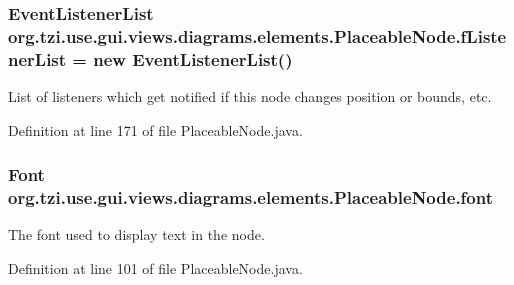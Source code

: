 \hypertarget{classorg_1_1tzi_1_1use_1_1gui_1_1views_1_1diagrams_1_1elements_1_1_placeable_node_a5bed45ff06fa7f6babf3260525d694c7}{
\subsubsection[{f\-Listener\-List}]{\setlength{\rightskip}{0pt plus 5cm}Event\-Listener\-List org.\-tzi.\-use.\-gui.\-views.\-diagrams.\-elements.\-Placeable\-Node.\-f\-Listener\-List = new Event\-Listener\-List()\hspace{0.3cm}{\ttfamily [protected]}}}\label{classorg_1_1tzi_1_1use_1_1gui_1_1views_1_1diagrams_1_1elements_1_1_placeable_node_a5bed45ff06fa7f6babf3260525d694c7}
List of listeners which get notified if this node changes position or bounds, etc. 

Definition at line 171 of file Placeable\-Node.\-java.

\hypertarget{classorg_1_1tzi_1_1use_1_1gui_1_1views_1_1diagrams_1_1elements_1_1_placeable_node_af4388194b24b4b30c30c5159498a4625}{
\subsubsection[{font}]{\setlength{\rightskip}{0pt plus 5cm}Font org.\-tzi.\-use.\-gui.\-views.\-diagrams.\-elements.\-Placeable\-Node.\-font\hspace{0.3cm}{\ttfamily [protected]}}}\label{classorg_1_1tzi_1_1use_1_1gui_1_1views_1_1diagrams_1_1elements_1_1_placeable_node_af4388194b24b4b30c30c5159498a4625}
The font used to display text in the node. 

Definition at line 101 of file Placeable\-Node.\-java.

